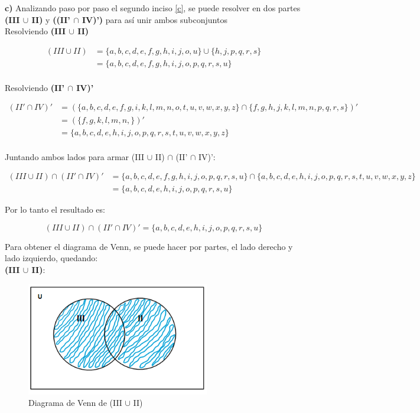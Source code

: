 \newpage

\textbf{c)} Analizando paso por paso el segundo inciso \ref{c}, se puede resolver en dos partes \textbf{(III $\cup$ II)} y \textbf{((II' $\cap$ IV)')} para así unir ambos subconjuntos \\

Resolviendo \textbf{(III $\cup$ II)}

\begin{align*}
(III \cup II)  &= \{ a, b, c, d, e, f, g, h, i, j, o, u  \}   \cup \{ h, j, p, q, r, s  \} \\
  &=  \{ a, b, c, d, e, f, g, h, i, j, o, p, q, r, s, u  \}        \\
\end{align*}

Resolviendo \textbf{(II' $\cap$ IV)'}

\begin{align*}
(II' \cap IV)'  &=  (\{ a, b, c, d, e, f, g, i, k, l, m, n, o, t, u, v, w, x, y, z \} \cap \{ f, g, h, j, k, l, m, n, p, q, r, s  \} )' \\
  &=  (\{  f, g, k, l, m, n, \} )' \\
  &= \{ a, b, c, d, e, h, i, j, o, p, q, r, s, t, u, v, w, x, y, z \} \\
\end{align*}

Juntando ambos lados para armar (III $\cup$ II) $\cap$ (II' $\cap$ IV)':

\begin{align*}
(III \cup II) \cap (II' \cap IV)' &= \{ a, b, c, d, e, f, g, h, i, j, o, p, q, r, s, u  \} \cap \{ a, b, c, d, e, h, i, j, o, p, q, r, s, t, u, v, w, x, y, z \}\\
  &= \{ a, b, c, d, e, h, i, j, o, p, q, r, s, u \}
\end{align*}

Por lo tanto el resultado es:

\begin{equation*}
    \boxed{ (III \cup II) \cap (II' \cap IV)' =  \{ a, b, c, d, e, h, i, j, o, p, q, r, s, u \}    }
\end{equation*}



Para obtener el diagrama de Venn, se puede hacer por partes, el lado derecho y lado izquierdo, quedando: \\

\textbf{(III $\cup$ II)}: 

\begin{figure}[htbp]
\centering
\includegraphics[width=8cm]{c/aa.png}
\caption[]{Diagrama de Venn de (III $\cup$ II)}
\end{figure} 


